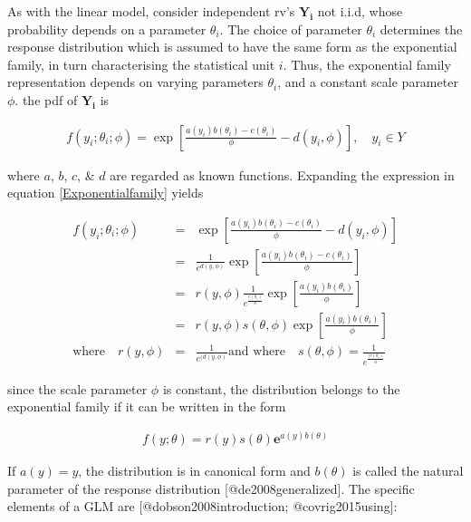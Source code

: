 \documentclass[]{article}
\begin{document}
As with the linear model, consider independent rv's \(\mathbf{Y_i}\) not
i.i.d, whose probability depends on a parameter \(\theta_i\). The choice
of parameter \(\theta_i\) determines the response distribution which is
assumed to have the same form as the exponential family, in turn
characterising the statistical unit \(i\). Thus, the exponential family
representation depends on varying parameters \(\theta_i\), and a
constant scale parameter \(\phi\). the pdf of \(\mathbf{Y_i}\) is

\singlespacing

\begin{eqnarray}\label{Exponentialfamily}
f(y_i;\theta_i;\phi) = \exp\left[\frac{a(y_i)b(\theta_i) -c(\theta_i)}{\phi}-d(y_i,\phi)\right], \quad y_i \in Y 
\end{eqnarray} \doublespacing

where \(a\), \(b\), \(c\), \& \(d\) are regarded as known functions.
Expanding the expression in equation \ref{Exponentialfamily} yields

\singlespacing

\begin{eqnarray}\label{Exponentialfamilies}
f(y_i;\theta_i;\phi) &=& \exp\left[\frac{a(y_i)b(\theta_i) -c(\theta_i)}{\phi}-d(y_i,\phi)\right] \nonumber\\
 &=& \frac{1}{e^{d(y,\phi)}}\exp\left[\frac{a(y_i)b(\theta_i) -c(\theta_i)}{\phi}\right] \nonumber\\
 &=& r(y,\phi)\frac{1}{e^{\frac{c(\theta_i)}{\phi}}}\exp\left[\frac{a(y_i)b(\theta_i)}{\phi}\right] \nonumber\\
 &=& r(y,\phi)s(\theta,\phi)\exp\left[\frac{a(y_i)b(\theta_i)}{\phi}\right]\\
 \mbox{where} \quad r(y,\phi) &=& \frac{1}{e^{(d(y,\phi)}} \mbox{and where}\quad s(\theta,\phi) = \frac{1}{e^{\frac{(c(\theta_i)}{\phi}}}\nonumber
\end{eqnarray} \doublespacing

since the scale parameter \(\phi\) is constant, the distribution belongs
to the exponential family if it can be written in the form

\singlespacing

\begin{eqnarray}\label{Exponential}
f(y;\theta) = r(y)s(\theta)\mathbf{e}^{a(y)b(\theta)}
\end{eqnarray} \doublespacing

If \(a(y) = y\), the distribution is in canonical form and \(b(\theta)\)
is called the natural parameter of the response distribution
{[}@de2008generalized{]}. The specific elements of a GLM are
{[}@dobson2008introduction; @covrig2015using{]}:
\end{document}
